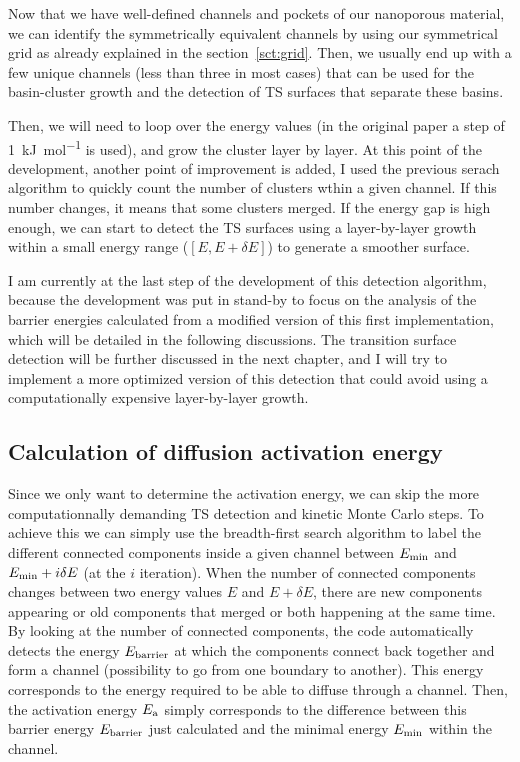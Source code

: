 \documentclass[main]{subfiles}
\begin{document}
Now that we have well-defined channels and pockets of our nanoporous material, we can identify the symmetrically equivalent channels by using our symmetrical grid as already explained in the section~\ref{sct:grid}. Then, we usually end up with a few unique channels (less than three in most cases) that can be used for the basin-cluster growth and the detection of TS surfaces that separate these basins. 

Then, we will need to loop over the energy values (in the original paper a step of \SI{1}{\kJ\per\mole} is used), and grow the cluster layer by layer. At this point of the development, another point of improvement is added, I used the previous serach algorithm to quickly count the number of clusters wthin a given channel. If this number changes, it means that some clusters merged. If the energy gap is high enough, we can start to detect the TS surfaces using a layer-by-layer growth within a small energy range ($[E,E+\delta E]$) to generate a smoother surface. 

I am currently at the last step of the development of this detection algorithm, because the development was put in stand-by to focus on the analysis of the barrier energies calculated from a modified version of this first implementation, which will be detailed in the following discussions. The transition surface detection will be further discussed in the next chapter, and I will try to implement a more optimized version of this detection that could avoid using a computationally expensive layer-by-layer growth. 

\subsection{Calculation of diffusion activation energy}

Since we only want to determine the activation energy, we can skip the more computationnally demanding TS detection and kinetic Monte Carlo steps. To achieve this we can simply use the breadth-first search algorithm to label the different connected components inside a given channel between $E_{\text{min}}$ and $E_{\text{min}}+i\delta E$ (at the $i$ iteration). When the number of connected components changes between two energy values $E$ and $E+\delta E$, there are new components appearing or old components that merged or both happening at the same time. By looking at the number of connected components, the code automatically detects the energy $E_{\text{barrier}}$ at which the components connect back together and form a channel (possibility to go from one boundary to another). This energy corresponds to the energy required to be able to diffuse through a channel. Then, the activation energy $E_{\text{a}}$ simply corresponds to the difference between this barrier energy $E_{\text{barrier}}$ just calculated and the minimal energy $E_{\text{min}}$ within the channel. 
\end{document}
